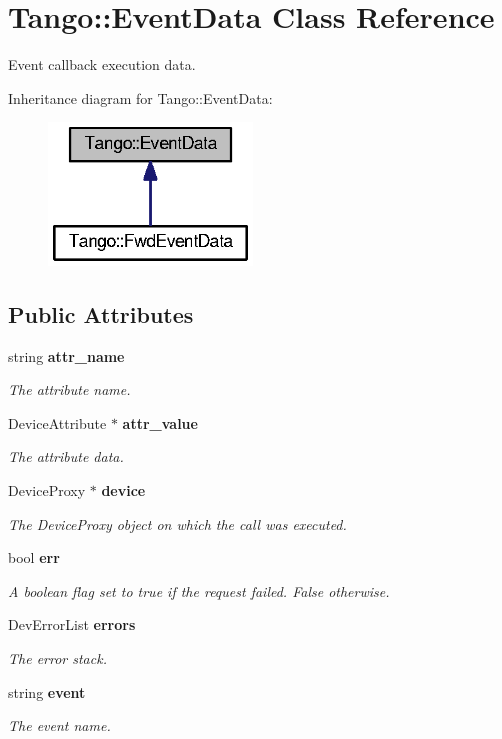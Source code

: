 \section{Tango\-:\-:Event\-Data Class Reference}
\label{classTango_1_1EventData}


Event callback execution data.  




Inheritance diagram for Tango\-:\-:Event\-Data\-:
\nopagebreak
\begin{figure}[H]
\begin{center}
\leavevmode
\includegraphics[width=154pt]{d6/da4/classTango_1_1EventData__inherit__graph}
\end{center}
\end{figure}
\subsection*{Public Attributes}
\begin{DoxyCompactItemize}
\item 
string {\bf attr\-\_\-name}
\begin{DoxyCompactList}\small\item\em The attribute name. \end{DoxyCompactList}\item 
Device\-Attribute $\ast$ {\bf attr\-\_\-value}
\begin{DoxyCompactList}\small\item\em The attribute data. \end{DoxyCompactList}\item 
Device\-Proxy $\ast$ {\bf device}
\begin{DoxyCompactList}\small\item\em The Device\-Proxy object on which the call was executed. \end{DoxyCompactList}\item 
bool {\bf err}
\begin{DoxyCompactList}\small\item\em A boolean flag set to true if the request failed. False otherwise. \end{DoxyCompactList}\item 
Dev\-Error\-List {\bf errors}
\begin{DoxyCompactList}\small\item\em The error stack. \end{DoxyCompactList}\item 
string {\bf event}
\begin{DoxyCompactList}\small\item\em The event name. \end{DoxyCompactList}\end{DoxyCompactItemize}


